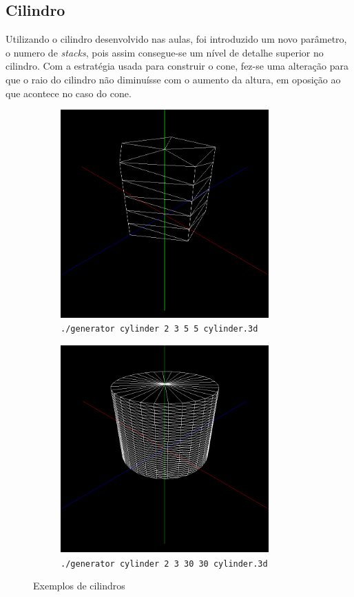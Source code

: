 \documentclass[11pt,a4paper]{report}
\begin{document}
\subsection{Cilindro}
\vspace{0.5cm}
Utilizando o cilindro desenvolvido nas aulas, foi introduzido um novo parâmetro, o numero de \textit{stacks}, pois assim consegue-se um nível de detalhe superior no cilindro.
Com a estratégia usada para construir o cone, fez-se uma alteração para que o raio do cilindro não diminuísse com o aumento da altura, em oposição ao que acontece no caso do cone.
\vspace{1cm}
\begin{figure}[H]
\centering
\begin{subfigure}{0.5\textwidth}
  \centering
  \includegraphics[width = 8cm,height = 8cm]{cilindro1.png}
  \caption{\texttt{./generator cylinder 2 3 5 5 cylinder.3d}}
  \label{fig:cylinder1}
\end{subfigure}%
\begin{subfigure}{0.5\textwidth}
  \centering
  \includegraphics[width = 8cm,height = 8cm]{cilindro2.png}
  \caption{\texttt{./generator cylinder 2 3 30 30 cylinder.3d}}
  \label{fig:cylinder2}
\end{subfigure}
\caption{Exemplos de cilindros}
\label{fig:cylinder}
\end{figure}
\newpage
\end{document}
